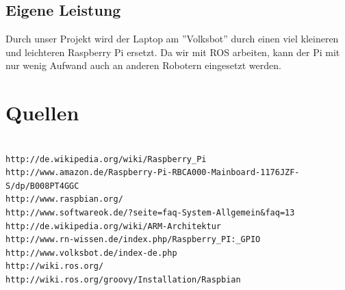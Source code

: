 \documentclass[12pt]{article}
\begin{document}

\subsection{Eigene Leistung}

Durch unser Projekt wird der Laptop am ''Volksbot'' durch einen viel kleineren und leichteren Raspberry Pi ersetzt. Da wir mit ROS arbeiten, kann der Pi mit nur wenig Aufwand auch an anderen Robotern eingesetzt werden.

\section{Quellen}
\begin{verbatim}

http://de.wikipedia.org/wiki/Raspberry_Pi
http://www.amazon.de/Raspberry-Pi-RBCA000-Mainboard-1176JZF-S/dp/B008PT4GGC
http://www.raspbian.org/
http://www.softwareok.de/?seite=faq-System-Allgemein&faq=13
http://de.wikipedia.org/wiki/ARM-Architektur
http://www.rn-wissen.de/index.php/Raspberry_PI:_GPIO
http://www.volksbot.de/index-de.php
http://wiki.ros.org/
http://wiki.ros.org/groovy/Installation/Raspbian
\end{verbatim}
\end{document}
